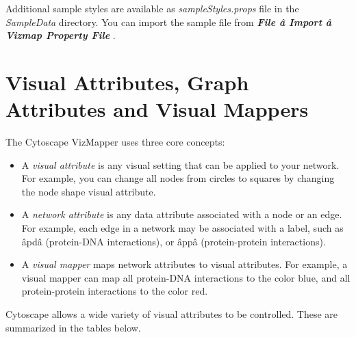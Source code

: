  Additional sample styles are available as \emph{sampleStyles.props}
 file in the \emph{SampleData}
 directory. You can import the sample file from \emph{\textbf{File \^a Import \^a Vizmap Property File}
}
. 


 
\section*{Visual Attributes, Graph Attributes and Visual Mappers}


 The Cytoscape VizMapper uses three core concepts: 
\begin{itemize}
\item 

 A \emph{visual attribute}
 is any visual setting that can be applied to your network. For example, you can change all nodes from circles to squares by changing the node shape visual attribute. 

\item 

 A \emph{network attribute}
 is any data attribute associated with a node or an edge. For example, each edge in a network may be associated with a label, such as \^apd\^a (protein-DNA interactions), or \^app\^a (protein-protein interactions). 

\item 

A \emph{visual mapper}
 maps network attributes to visual attributes. For example, a visual mapper can map all protein-DNA interactions to the color blue, and all protein-protein interactions to the color red. 
\end{itemize}
Cytoscape allows a wide variety of visual attributes to be controlled. These are summarized in the tables below. 

